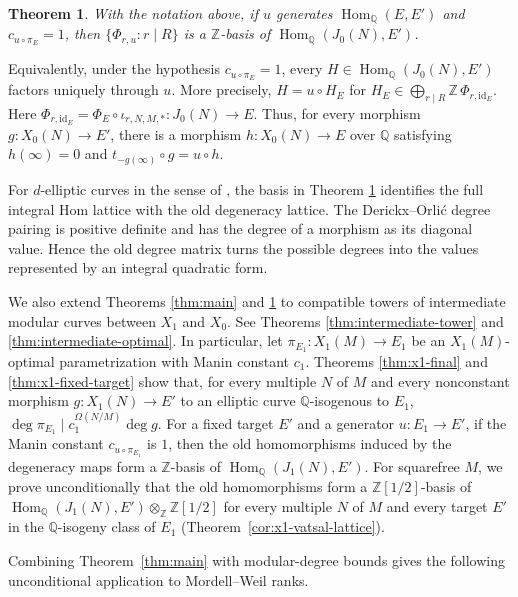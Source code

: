 \documentclass[12pt, letterpaper]{amsart}
\newtheorem{theorem}{Theorem}[section]
\theoremstyle{definition}
\theoremstyle{remark}
\newcommand{\Q}{\mathbb Q}
\newcommand{\Z}{\mathbb Z}
\newcommand{\Hom}{\operatorname{Hom}}
\numberwithin{equation}{section}
\begin{document}
\begin{theorem}\label{thm:lattice-main}
With the notation above, if
\(u\) generates \(\Hom_\Q(E,E')\) and \(c_{u\circ\pi_E}=1\), then
\(\{\Phi_{r,u}:r\mid R\}\) is a \(\Z\)-basis of
\(\Hom_\Q(J_0(N),E')\).
\end{theorem}

Equivalently, under the hypothesis \(c_{u\circ\pi_E}=1\), every
\(H\in\Hom_\Q(J_0(N),E')\) factors uniquely through \(u\). More precisely,
\(H=u\circ H_E\) for
\(H_E\in \bigoplus_{r\mid R}\Z\,\Phi_{r,\mathrm{id}_E}\). Here
\(\Phi_{r,\mathrm{id}_E}=\Phi_E\circ\iota_{r,N,M,*}:J_0(N)\to E\).
Thus, for every morphism \(g:X_0(N)\to E'\), there is a morphism
\(h:X_0(N)\to E\) over \(\Q\) satisfying \(h(\infty)=0\) and
\(t_{-g(\infty)}\circ g=u\circ h\).

For \(d\)-elliptic curves in the sense of
\cite{DerickxOrlic}, the basis in Theorem
\ref{thm:lattice-main} identifies the full integral Hom lattice with the old
degeneracy lattice. The Derickx--Orli\'c degree pairing
\cite{DerickxOrlic} is positive
definite and has the degree of a morphism as its diagonal value. Hence the old
degree matrix turns the possible degrees into the values represented by an
integral quadratic form.

We also extend Theorems \ref{thm:main} and \ref{thm:lattice-main} to compatible
towers of intermediate modular curves between \(X_1\) and \(X_0\). See Theorems
\ref{thm:intermediate-tower} and \ref{thm:intermediate-optimal}.
In particular, let \(\pi_{E_1}:X_1(M)\to E_1\) be an \(X_1(M)\)-optimal
parametrization with Manin constant \(c_1\). Theorems \ref{thm:x1-final} and
\ref{thm:x1-fixed-target} show
that, for every multiple \(N\) of \(M\) and every nonconstant morphism
\(g:X_1(N)\to E'\) to an elliptic curve \(\Q\)-isogenous to \(E_1\),
\(\deg\pi_{E_1}\mid c_1^{\Omega(N/M)}\deg g\). For a fixed target \(E'\) and a
generator \(u:E_1\to E'\), if the Manin constant \(c_{u\circ\pi_{E_1}}\) is
\(1\), then the old homomorphisms induced by the degeneracy maps form a
\(\Z\)-basis of \(\Hom_\Q(J_1(N),E')\).
For squarefree \(M\), we prove unconditionally that the old homomorphisms
form a \(\Z[1/2]\)-basis of
\(\Hom_\Q(J_1(N),E')\otimes_\Z\Z[1/2]\) for every multiple \(N\) of \(M\)
and every target \(E'\) in the \(\Q\)-isogeny class of \(E_1\)
(Theorem~\ref{cor:x1-vatsal-lattice}).

Combining Theorem~\ref{thm:main} with modular-degree bounds
gives the following unconditional application to Mordell--Weil ranks.
\end{document}
